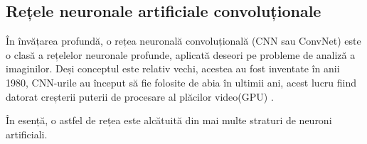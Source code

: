 \documentclass[a4paper, 12pt]{article}
\begin{document}
	
	\bigskip
	\subsection{Rețele neuronale artificiale convoluționale}
	\bigskip
	
	\quad \space În învățarea profundă, o rețea neuronală convoluțională (CNN sau ConvNet) este o clasă a rețelelor neuronale profunde, aplicată deseori pe probleme de analiză a imaginilor. Deși conceptul este relativ vechi, acestea au fost inventate în anii 1980, CNN-urile au început să fie folosite de abia în ultimii ani, acest lucru fiind datorat creșterii puterii de procesare al plăcilor video(GPU) \textbf{\cite{kakizaki2019adversarial}}.
	
	În esență, o astfel de rețea este alcătuită din mai multe straturi de neuroni artificiali.
	
\end{document}

